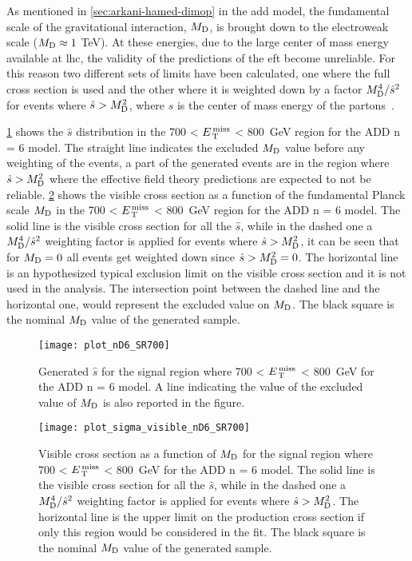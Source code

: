 As mentioned in \cref{sec:arkani-hamed-dimop} in the \gls{add} model, the
fundamental scale of the gravitational interaction, $M_\mathrm{D}$, is brought down to
the electroweak scale ($M_\mathrm{D} \approx 1~$TeV). At these energies, due to the large
center of mass energy available at \gls{lhc}, the validity of the predictions of
the \gls{eft} become unreliable. For this reason two different sets of limits
have been calculated, one where the full cross section is used and the other
where it is weighted down by a factor $M_\mathrm{D}^4/\hat{s}^2$ for events where
$\hat{s} > M_\mathrm{D}^2$, where $\hat{s}$ is the center of mass energy of the
partons~\cite{LEDWeightFactor}.


\cref{fig:shat} shows the $\hat{s}$ distribution in the 700 < $E_\mathrm{\, T}^\mathrm{\, miss}$ < 800~GeV
region for the ADD n = 6 model. The straight line indicates the excluded $M_\mathrm{D}$
value before any weighting of the events, a part of the generated events are in
the region where $\hat{s} > M_\mathrm{D}^2$ where the effective field theory predictions
are expected to not be reliable. \cref{fig:vis_sigma_trunc} shows the visible
cross section as a function of the fundamental Planck scale $M_\mathrm{D}$ in the 700 <
$E_\mathrm{\, T}^\mathrm{\, miss}$ < 800~GeV region for the ADD n = 6 model. The solid line is the visible
cross section for all the $\hat{s}$, while in the dashed one a $M_\mathrm{D}^4/\hat{s}^2$
weighting factor is applied for events where $\hat{s} > M_\mathrm{D}^2$, it can be seen
that for $M_\mathrm{D} = 0$ all events get weighted down since $\hat{s} > M_\mathrm{D}^2 = 0$. The
horizontal line is an hypothesized typical exclusion limit on the visible cross
section and it is not used in the analysis. The intersection point between the
dashed line and the horizontal one, would represent the excluded value on
$M_\mathrm{D}$. The black square is the nominal $M_\mathrm{D}$ value of the generated sample.

\begin{figure}[!h]
  \centering
  \texttt{[image: plot\_nD6\_SR700]}
  \caption{Generated $\hat{s}$ for the signal region where 700 < $E_\mathrm{\, T}^\mathrm{\, miss}$ <
    800~GeV for the ADD n = 6 model. A line indicating the value of the excluded
    value of $M_\mathrm{D}$ is also reported in the figure.}
  \label{fig:shat}
\end{figure}

\begin{figure}[!h]
  \centering
  \texttt{[image: plot\_sigma\_visible\_nD6\_SR700]}
  \caption{Visible cross section as a function of $M_\mathrm{D}$ for the signal region
    where 700 < $E_\mathrm{\, T}^\mathrm{\, miss}$ < 800~GeV for the ADD n = 6 model. The solid line is the
    visible cross section for all the $\hat{s}$, while in the dashed one a
    $M_\mathrm{D}^4/\hat{s}^2$ weighting factor is applied for events where
    $\hat{s} > M_\mathrm{D}^2$. The horizontal line is the upper limit on the production
    cross section if only this region would be considered in the fit. The black
    square is the nominal $M_\mathrm{D}$ value of the generated sample.}
  \label{fig:vis_sigma_trunc}
\end{figure}
